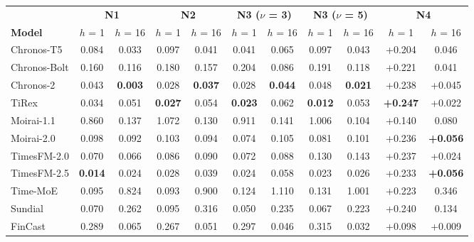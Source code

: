 \begin{tabular}{@{}lcccccccccc@{}}
\toprule
 & \multicolumn{2}{c}{\textbf{N1}} & \multicolumn{2}{c}{\textbf{N2}} & \multicolumn{2}{c}{\textbf{N3 ($\nu$ = 3)}} & \multicolumn{2}{c}{\textbf{N3 ($\nu$ = 5)}} & \multicolumn{2}{c}{\textbf{N4}} \\
\cmidrule(lr){2-3}\cmidrule(lr){4-5}\cmidrule(lr){6-7}\cmidrule(lr){8-9}\cmidrule(lr){10-11}
\textbf{Model} & $h$ = 1 & $h$ = 16 & $h$ = 1 & $h$ = 16 & $h$ = 1 & $h$ = 16 & $h$ = 1 & $h$ = 16 & $h$ = 1 & $h$ = 16 \\
\midrule
Chronos-T5 & \textminus{}0.084 & \textminus{}0.033 & \textminus{}0.097 & \textminus{}0.041 & \textminus{}0.041 & \textminus{}0.065 & \textminus{}0.097 & \textminus{}0.043 & +0.204 & \textminus{}0.046 \\
Chronos-Bolt & \textminus{}0.160 & \textminus{}0.116 & \textminus{}0.180 & \textminus{}0.157 & \textminus{}0.204 & \textminus{}0.086 & \textminus{}0.191 & \textminus{}0.118 & +0.221 & \textminus{}0.041 \\
Chronos-2 & \textminus{}0.043 & \textbf{\textminus{}0.003} & \textminus{}0.028 & \textbf{\textminus{}0.037} & \textminus{}0.028 & \textbf{\textminus{}0.044} & \textminus{}0.048 & \textbf{\textminus{}0.021} & +0.238 & +0.045 \\
TiRex & \textminus{}0.034 & \textminus{}0.051 & \textbf{\textminus{}0.027} & \textminus{}0.054 & \textbf{\textminus{}0.023} & \textminus{}0.062 & \textbf{\textminus{}0.012} & \textminus{}0.053 & \textbf{+0.247} & +0.022 \\
Moirai-1.1 & \textminus{}0.860 & \textminus{}0.137 & \textminus{}1.072 & \textminus{}0.130 & \textminus{}0.911 & \textminus{}0.141 & \textminus{}1.006 & \textminus{}0.104 & +0.140 & \textminus{}0.080 \\
Moirai-2.0 & \textminus{}0.098 & \textminus{}0.092 & \textminus{}0.103 & \textminus{}0.094 & \textminus{}0.074 & \textminus{}0.105 & \textminus{}0.081 & \textminus{}0.101 & +0.236 & \textbf{+0.056} \\
TimesFM-2.0 & \textminus{}0.070 & \textminus{}0.066 & \textminus{}0.086 & \textminus{}0.090 & \textminus{}0.072 & \textminus{}0.088 & \textminus{}0.130 & \textminus{}0.143 & +0.237 & +0.024 \\
TimesFM-2.5 & \textbf{\textminus{}0.014} & \textminus{}0.024 & \textminus{}0.028 & \textminus{}0.039 & \textminus{}0.024 & \textminus{}0.058 & \textminus{}0.023 & \textminus{}0.026 & +0.233 & \textbf{+0.056} \\
Time-MoE & \textminus{}0.095 & \textminus{}0.824 & \textminus{}0.093 & \textminus{}0.900 & \textminus{}0.124 & \textminus{}1.110 & \textminus{}0.131 & \textminus{}1.001 & +0.223 & \textminus{}0.346 \\
Sundial & \textminus{}0.070 & \textminus{}0.262 & \textminus{}0.095 & \textminus{}0.316 & \textminus{}0.050 & \textminus{}0.235 & \textminus{}0.067 & \textminus{}0.223 & +0.240 & \textminus{}0.134 \\
FinCast & \textminus{}0.289 & \textminus{}0.065 & \textminus{}0.267 & \textminus{}0.051 & \textminus{}0.297 & \textminus{}0.046 & \textminus{}0.315 & \textminus{}0.032 & +0.098 & +0.009 \\
\bottomrule
\end{tabular}
